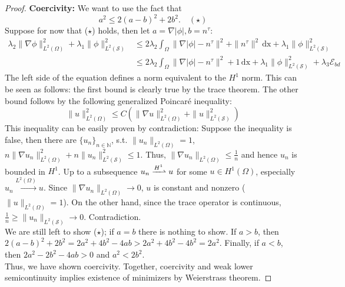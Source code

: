 \documentclass[12pt,openany]{book}
\def\S{\mathcal{S}}
\theoremstyle{plainnormal}
\theoremstyle{remark}
\begin{document}
\begin{proof}
\textbf{Coercivity:} We want to use the fact that 
$$
    a^2 \leq 2(a-b)^2 + 2b^2. \quad {(\star)}
$$
Suppose for now that ($\star$) holds, then let $a = \nabla |\phi|, b = n^\tau$: 
\begin{align*}
    \lambda_2\|\nabla \phi\| ^2_{L^2(\Omega)} + \lambda_1 \|\phi\| ^2_{L^2(\S)} &\leq 2 \lambda_2\int_\Omega \| \nabla |\phi| - n^\tau\|^2 
 + \|n^\tau\|^2\,\mathrm{dx}+ \lambda_1 \|\phi\| ^2_{L^2(\S)}\\
 &\leq 2 \lambda_2\int_\Omega \| \nabla |\phi| - n^\tau\|^2 
 + 1 \,\mathrm{dx}+ \lambda_1 \|\phi\| ^2_{L^2(\S)} + \lambda_3 \mathcal{E}_{bd}
\end{align*} 
The left side of the equation defines a norm equivalent to the $H^1$ norm. This can be seen as follows: the first bound is clearly true by the trace theorem. The other bound follows by the following generalized Poincar\'e inequality: $$\|u\|^2_{L^2(\Omega)} \leq C( \|\nabla u\|^2_{L^2(\Omega)} +  \|u\|^2_{L^2(\mathcal{\S})})$$
This inequality can be easily proven by contradiction: Suppose the inequality is false, then there are $\{u_n\}_{n\in\mathbb N}$, s.t. $\|u_n\|_{L^2(\Omega)} = 1$, $n\|\nabla u_n\|^2_{L^2(\Omega)} +  n\|u_n\|^2_{L^2(\mathcal{\S})} \leq 1$. Thus, $\|\nabla u_n\|_{L^2(\Omega)} \leq \frac{1}{n}$ and hence $u_n$ is bounded in $H^1$. Up to a subsequence $u_n \xrightharpoonup{H^1}u$ for some $u\in H^1(\Omega)$, especially $u_n \xrightarrow{L^2(\Omega)}u$. Since $\|\nabla u_n\|_{L^2(\Omega)} \rightarrow 0$, $u$ is constant and nonzero ($\|u\|_{L^2(\Omega)} = 1$). On the other hand, since the trace operator is continuous, $\frac{1}{n} \geq \|u_n\|_{L^2(\S)} \rightarrow 0 $. Contradiction.\\
We are still left to show ($\star$); if $a=b$ there is nothing to show. If $a> b$, then $2(a-b)^2  + 2b^2 = 2a^2 + 4b^2 - 4ab > 2a^2 +4b^2 - 4b^2 = 2a^2 $. Finally, if $a<b$, then $2a^2 - 2b^2 - 4ab > 0$ and $a^2 < 2b^2$.\\
Thus, we have shown coercivity.
Together, coercivity and weak lower semicontinuity implies existence of minimizers by Weierstrass theorem.
\end{proof}
\end{document}
